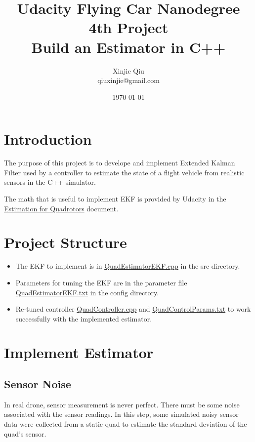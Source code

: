 \documentclass[letterpaper]{article}
\title{Udacity Flying Car Nanodegree 4th Project\\ 
       Build an Estimator in C++}
\author{Xinjie Qiu \\
        qiuxinjie@gmail.com}
\date{\today}
\begin{document}
\maketitle

\section{Introduction}

The purpose of this project is to develope and implement Extended Kalman Filter used by a controller to estimate the state of a flight vehicle from realistic sensors in the C++ simulator. 


The math that is useful to implement EKF is provided by Udacity in the \href{https://www.overleaf.com/read/vymfngphcccj}{Estimation for Quadrotors} document.

\section{Project Structure}

\begin{itemize}
  \setlength\itemsep{0em}
  \item The EKF to implement is in \href{https://github.com/tjphoton/FCND/blob/master/FCND-P4-Estimation-CPP/src/QuadEstimatorEKF.cpp}{QuadEstimatorEKF.cpp} in the src directory.
  \item Parameters for tuning the EKF are in the parameter file \href{https://github.com/tjphoton/FCND/blob/master/FCND-P4-Estimation-CPP/config/QuadEstimatorEKF.txt}{QuadEstimatorEKF.txt} in the config directory.
  \item Re-tuned controller \href{https://github.com/tjphoton/FCND/blob/master/FCND-P4-Estimation-CPP/src/QuadControl.cpp}{QuadController.cpp} and \href{https://github.com/tjphoton/FCND/blob/master/FCND-P4-Estimation-CPP/config/QuadControlParams.txt}{QuadControlParams.txt} to work successfully with the implemented estimator.
\end{itemize}

\section{Implement Estimator}

\subsection{Sensor Noise}

In real drone, sensor measurement is never perfect. There must be some noise associated with the sensor readings. In this step, some simulated noisy sensor data were collected from a static quad to estimate the standard deviation of the quad's sensor.
\end{document}
